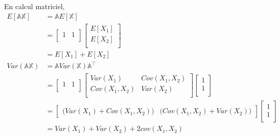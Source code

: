 \documentclass[11pt,french]{report}
\begin{document}
En calcul matriciel,
\begin{align*}
E[\mathbb{A} \mathbb{X}] &= \mathbb{A} E[\mathbb{X}]  \\
&= 
\begin{bmatrix} 
     1 & 1 \\
\end{bmatrix} 
\begin{bmatrix} 
     E[X_1] \\
     E[X_2]\\
\end{bmatrix} \\
&= E[X_1] + E[X_2] \\
Var(\mathbb{A} \mathbb{X}) &= \mathbb{A}Var(\mathbb{X})\mathbb{A}^\intercal \\
&= 
\begin{bmatrix} 
     1 & 1 \\
\end{bmatrix}
\begin{bmatrix} 
Var(X_1)  & Cov(X_1,X_2) \\
Cov(X_1,X_2) & Var(X_2)\\
\end{bmatrix} 
\begin{bmatrix} 
     1  \\
     1  \\
\end{bmatrix}\\
&= 
\begin{bmatrix} 
\big(Var(X_1)  + Cov(X_1,X_2) \big) &\big(Cov(X_1,X_2) + Var(X_2) \big) 
\end{bmatrix}
\begin{bmatrix} 
     1  \\
     1  \\
\end{bmatrix}\\
&= Var(X_1) + Var(X_2) + 2cov(X_1, X_2) \\
\end{align*}
\end{document}
